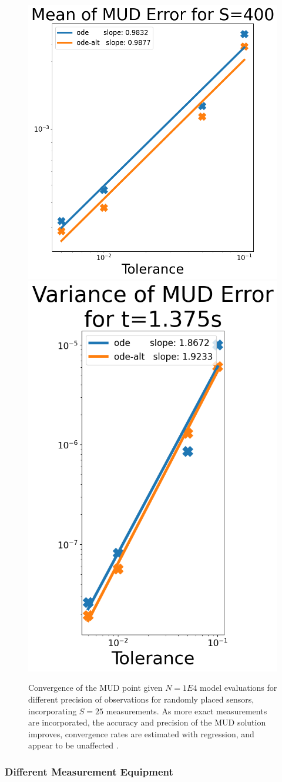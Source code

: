 \begin{figure}[htbp]
  \centering
  \includegraphics[width=0.475\linewidth]{figures/ode/ode_convergence_mud_std_mean}
  \includegraphics[width=0.425\linewidth]{figures/ode/ode_convergence_mud_std_var}

  \caption{Convergence of the MUD point given $N=1E4$ model evaluations for different precision of observations for randomly placed sensors, incorporating $S=25$ measurements.
  As more exact measurements are incorporated, the accuracy and precision of the MUD solution improves, convergence rates are estimated with regression, and appear to be unaffected .
  }
  \label{fig:ode-convergence-std}
\end{figure}




\subsubsection{Different Measurement Equipment}

